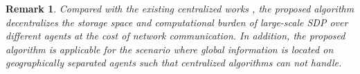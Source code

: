 \documentclass[journal]{IEEEtran}
\newtheorem{remark}{Remark}[section]
\begin{document}
\begin{remark}\label{syn_mark}
	Compared with the existing centralized works \cite{wang2017mixing,saddle_escape}, the proposed algorithm decentralizes the storage space and computational burden of large-scale SDP over different agents at the cost of network communication. In addition, the proposed algorithm is applicable for the scenario where global information is located on geographically separated agents such that centralized algorithms can not handle.%
\end{remark}
\end{document}
